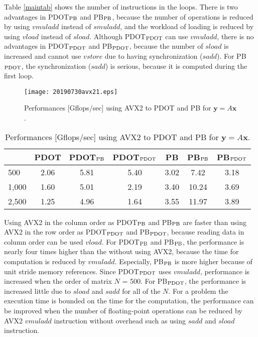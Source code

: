 \documentclass{IOS-Book-Article}
\begin{document}
Table \ref{maintab} shows the number of instructions in the loops.
There is two advantages in PDOT$_{\rm{PB}}$ and PB$_{\rm{PB}}$, because the number of operations is reduced by using $vmuladd$ instead of $smuladd$, and the workload of loading is reduced by using $vload$ instead of $sload$. Although PDOT$_{\rm{PDOT}}$ can use $vmuladd$, there is no advantages in PDOT$_{\rm{PDOT}}$ and PB$_{\rm{PDOT}}$, because the number of $sload$ is increased and cannot use $vstore$ due to having synchronization ($sadd$). For PB$_{\rm{PDOT}}$, the synchronization ($sadd$) is serious, because it is computed during the first loop.

\begin{figure}[htbp]
  \begin{center}
    \texttt{[image: 20190730avx21.eps]}
    \caption{Performances [Gflops/sec] using AVX2 to PDOT and PB for $\bm{y} = A\bm{x}$.}
    \label{figMV}
  \end{center}
\end{figure}

\begin{table}[htbp]
\centering
\footnotesize
\caption{Performances [Gflops/sec] using AVX2 to PDOT and PB for $\bm{y} = A\bm{x}$. }
\label{MVavx}
\begin{tabular}{l||c|cc||c|cc}
\hline
                       & PDOT    & PDOT$_{\rm{PB}}$       & PDOT$_{\rm{PDOT}}$      & PB   & PB$_{\rm{PB}}$        & PB$_{\rm{PDOT}}$       \\ \hline
\multirow{1}{*}{500}   & 2.06  & 5.81  & 5.40 & 3.02 & 7.42  & 3.18 \\  
\multirow{1}{*}{1,000} & 1.60  & 5.01  & 2.19 & 3.40 & 10.24 & 3.69 \\
\multirow{1}{*}{2,500} & 1.25  & 4.96  & 1.64 & 3.55 & 11.97 & 3.89 \\ \hline
\end{tabular}
\end{table}

Using AVX2 in the column order as PDOT$_{\rm{PB}}$ and PB$_{\rm{PB}}$ are faster than using AVX2 in the row order as PDOT$_{\rm{PDOT}}$ and PB$_{\rm{PDOT}}$, because reading data in column order can be used $vload$.
For PDOT$_{\rm{PB}}$ and PB$_{\rm{PB}}$, the performance is nearly four times higher than the without using AVX2, because the time for computation is reduced by $vmuladd$. Especially, PB$_{\rm{PB}}$ is more higher because of unit stride memory references. Since PDOT$_{\rm{PDOT}}$ uses $vmuladd$, performance is increased when the order of matrix $N$ = 500. For PB$_{\rm{PDOT}}$, the performance is increased little due to $sload$ and $sadd$ for all of the $N$.
For a problem the execution time is bounded on the time for the computation, the performance can be improved when the number of floating-point operations can be reduced by AVX2 $vmuladd$ instruction without overhead such as using $sadd$ and $sload$ instruction.
\end{document}
